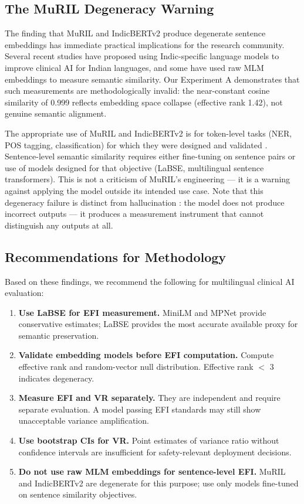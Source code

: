 \documentclass[11pt,a4paper]{article}
\begin{document}
\subsection{The MuRIL Degeneracy Warning}

The finding that MuRIL and IndicBERTv2 produce degenerate sentence embeddings has
immediate practical implications for the research community. Several recent studies have
proposed using Indic-specific language models to improve clinical AI for Indian languages,
and some have used raw MLM embeddings to measure semantic similarity. Our Experiment A
demonstrates that such measurements are methodologically invalid: the near-constant cosine
similarity of 0.999 reflects embedding space collapse (effective rank 1.42), not genuine
semantic alignment.

The appropriate use of MuRIL and IndicBERTv2 is for token-level tasks (NER, POS tagging,
classification) for which they were designed and validated \citep{doddapaneni2023}. Sentence-level semantic
similarity requires either fine-tuning on sentence pairs or use of models designed for
that objective (LaBSE, multilingual sentence transformers). This is not a criticism of
MuRIL's engineering --- it is a warning against applying the model outside its intended
use case. Note that this degeneracy failure is distinct from hallucination \citep{huang2024}:
the model does not produce incorrect outputs --- it produces a measurement instrument that
cannot distinguish any outputs at all.

\subsection{Recommendations for Methodology}

Based on these findings, we recommend the following for multilingual clinical AI
evaluation:

\begin{enumerate}
    \item \textbf{Use LaBSE for EFI measurement.} MiniLM and MPNet provide conservative
    estimates; LaBSE provides the most accurate available proxy for semantic preservation.
    \item \textbf{Validate embedding models before EFI computation.} Compute effective
    rank and random-vector null distribution. Effective rank $<$ 3 indicates degeneracy.
    \item \textbf{Measure EFI and VR separately.} They are independent and require
    separate evaluation. A model passing EFI standards may still show unacceptable
    variance amplification.
    \item \textbf{Use bootstrap CIs for VR.} Point estimates of variance ratio without
    confidence intervals are insufficient for safety-relevant deployment decisions.
    \item \textbf{Do not use raw MLM embeddings for sentence-level EFI.} MuRIL and
    IndicBERTv2 are degenerate for this purpose; use only models fine-tuned on sentence
    similarity objectives.
\end{enumerate}
\end{document}
